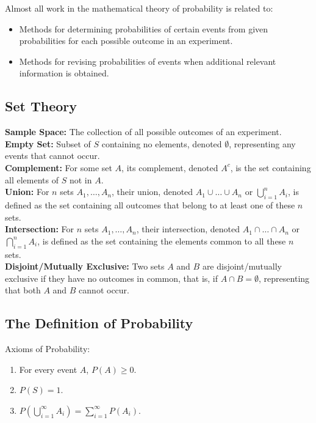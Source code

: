 \documentclass[11pt]{article}
\begin{document}
Almost all work in the mathematical theory of probability is related to:
\begin{itemize}
    \item Methods for determining probabilities of certain events from given probabilities for
    each possible outcome in an experiment.
    \item Methods for revising probabilities of events when additional relevant information is 
    obtained.
\end{itemize}

\subsection{Set Theory}

\textbf{Sample Space:} The collection of all possible outcomes of an experiment. \\
\textbf{Empty Set:} Subset of $S$ containing no elements, denoted $\emptyset$, representing
any events that cannot occur. \\
\textbf{Complement:} For some set $A$, its complement, denoted $A^c$, is the set containing all 
elements of $S$ not in $A$. \\
\textbf{Union:} For $n$ sets $A_1, \ldots, A_n$, their union, denoted $A_1 \cup \ldots \cup A_n
$ or $ \bigcup_{i=1}^{n} A_i $, is defined as the set containing all outcomes that belong to at
least one of these $n$ sets. \\
\textbf{Intersection:} For $n$ sets $A_1, \ldots, A_n$, their intersection, denoted $A_1 \cap 
\ldots \cap A_n $ or $ \bigcap_{i=1}^{n} A_i $, is defined as the set containing the elements 
common to all these $n$ sets. \\
\textbf{Disjoint/Mutually Exclusive:} Two sets $A$ and $B$ are disjoint/mutually exclusive if 
they have no outcomes in common, that is, if $ A \cap B = \emptyset $, representing that both
$A$ and $B$ cannot occur.

\subsection{The Definition of Probability}

Axioms of Probability:
\begin{enumerate}
    \item For every event $A$, $P(A) \ge 0$.
    \item $P(S) = 1$.
    \item $P( \bigcup_{i=1}^{\infty} A_i) = \sum_{i=1}^{\infty}P(A_i)$.
\end{enumerate}
\end{document}

